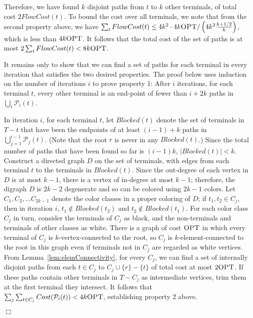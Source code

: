 \documentclass[11pt]{article}
\newcommand{\opt}{\text{\sc OPT}}
\newenvironment{proofof}[1]{\smallskip\noindent{\bf Proof of #1:}}{\hspace*{\fill}$\Box$\par}
\def\script#1{\mathcal{#1}}
\begin{document}
\begin{proofof}{Theorem~\ref{thm:kconnAug}}
  Therefore, we have found $k$ disjoint paths from $t$ to $k$ other
  terminals, of total cost $2 FlowCost(t)$. To bound the cost over all
  terminals, we note that from the second property above, we have
  $\sum_t FlowCost(t) \le 4k^2 \cdot 4k \opt / \left( 4k^2
    \frac{k+1/2}{k} \right)$, which is less than $4k \opt$. It follows
  that the total cost of the set of paths is at most $2 \sum_t
  FlowCost(t) < 8k \opt$.


  \bigskip 
  It remains only to show that we can find a set of paths for each
  terminal in every iteration that satisfies the two desired
  properties.  The proof below uses induction on the number of
  iterations $i$ to prove property 1: After $i$ iterations, for each
  terminal $t$, every other terminal is an end-point of fewer than $i
  + 2k$ paths in $\bigcup_i \script{P}_i(t)$.

  In iteration $i$, for each terminal $t$, let $Blocked(t)$ denote the
  set of terminals in $T - t$ that have been the endpoints of at least
  $(i-1) + k$ paths in $\bigcup_{j=1}^{i-1} \script{P}_j(t)$. (Note
  that the root $r$ is never in any $Blocked(t)$.) Since the total
  number of paths that have been found so far is $(i-1)k$,
  $|Blocked(t)| < k$. Construct a directed graph $D$ on the set of
  terminals, with edges from each terminal $t$ to the terminals in
  $Blocked(t)$. Since the out-degree of each vertex in $D$ is at most
  $k-1$, there is a vertex of in-degree at most $k-1$; therefore, the
  digraph $D$ is $2k-2$ degenerate and so can be colored using $2k-1$
  colors. Let $C_1, C_2, \ldots C_{2k-1}$ denote the color classes in
  a proper coloring of $D$; if $t_1, t_2 \in C_j$, then in iteration
  $i$, $t_1 \notin Blocked(t_2)$ and $t_2 \notin Blocked(t_1)$. For
  each color class $C_j$ in turn, consider the terminals of $C_j$ as
  black, and the non-terminals and terminals of other classes as
  white. There is a graph of cost $\opt$ in which every terminal of
  $C_j$ is $k$-vertex-connected to the root, so $C_j$ is
  $k$-element-connected to the root in this graph even if terminals
  not in $C_j$ are regarded as white vertices. From
  Lemma~\ref{lem:elemConnectivity}, for every $C_j$, we can find a set
  of internally disjoint paths from each $t \in C_j$ to $C_j \cup\{r\}
  - \{t\}$ of total cost at most $2 \opt$. If these paths contain
  other terminals in $T - C_j$ as intermediate vertices, trim them at
  the first terminal they intersect. It follows that $\sum_j \sum_{t
    \in C_j} Cost(\script{P}_i(t)) < 4k \opt$, establishing property 2
  above.


\end{proofof}
\end{document}
